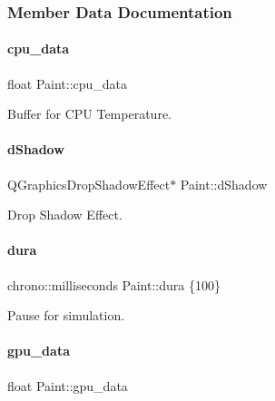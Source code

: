\subsubsection{Member Data Documentation}
\mbox{\label{classPaint_a289c2a24e5186491ddd37a620eaac8b2}} 
\paragraph{\texorpdfstring{cpu\_data}{cpu\_data}}
{\footnotesize\ttfamily float Paint\+::cpu\+\_\+data\hspace{0.3cm}{\ttfamily [private]}}



Buffer for C\+PU Temperature. 

\mbox{\label{classPaint_adc5781ac10ec78958b8818b46a096914}} 
\paragraph{\texorpdfstring{dShadow}{dShadow}}
{\footnotesize\ttfamily Q\+Graphics\+Drop\+Shadow\+Effect$\ast$ Paint\+::d\+Shadow\hspace{0.3cm}{\ttfamily [private]}}



Drop Shadow Effect. 

\mbox{\label{classPaint_a596f261f63bbc34d4ec35639eeb148ce}} 
\paragraph{\texorpdfstring{dura}{dura}}
{\footnotesize\ttfamily chrono\+::milliseconds Paint\+::dura \{100\}\hspace{0.3cm}{\ttfamily [private]}}



Pause for simulation. 

\mbox{\label{classPaint_a561a7ed14d82369f8a88ba76b0bcbb7e}} 
\paragraph{\texorpdfstring{gpu\_data}{gpu\_data}}
{\footnotesize\ttfamily float Paint\+::gpu\+\_\+data\hspace{0.3cm}{\ttfamily [private]}}



